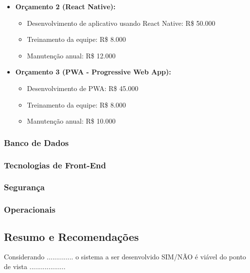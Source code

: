 \begin{itemize}
\begin{itemize}
			\item \textbf{Orçamento 2 (React Native):}
			\begin{itemize}
				\item Desenvolvimento de aplicativo usando React Native: R\$ 50.000
				\item Treinamento da equipe: R\$ 8.000
				\item Manutenção anual: R\$ 12.000
			\end{itemize}
			
			\item \textbf{Orçamento 3 (PWA - Progressive Web App):}
			\begin{itemize}
				\item Desenvolvimento de PWA: R\$ 45.000
				\item Treinamento da equipe: R\$ 8.000
				\item Manutenção anual: R\$ 10.000
			\end{itemize}
		\end{itemize}
	\end{itemize}

	\subsubsection{Banco de Dados}
	
	
	\subsubsection{Tecnologias de Front-End}
	
	
	\subsubsection{Segurança}
	
	
	\subsubsection{Operacionais}


       \subsection{Resumo e Recomenda\c{c}\~{o}es}

       Considerando .............. o sistema a ser desenvolvido SIM/N\~{A}O \'{e} vi\'{a}vel do ponto de vista ...................
